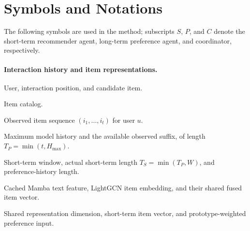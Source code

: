 \documentclass[11pt]{article}
\begin{document}

\appendix
\section{Symbols and Notations}
\label{app:notations}
The following symbols are used in the method; subscripts $S$, $P$, and $C$ denote the short-term recommender agent, long-term preference agent, and coordinator, respectively.

\paragraph{Interaction history and item representations.}
\begin{description}[leftmargin=2.4cm,labelwidth=2.1cm,itemsep=0pt]
\item[$u,t,i$] User, interaction position, and candidate item.
\item[$\mathcal I$] Item catalog.
\item[$\mathcal H_{u,t}$] Observed item sequence $(i_1,\ldots,i_t)$ for user $u$.
\item[$H_{\max},\overline{\mathcal H}_{u,t}$] Maximum model history and the available observed suffix, of length $T_P=\min(t,H_{\max})$.
\item[$W,T_S,T_P$] Short-term window, actual short-term length $T_S=\min(T_P,W)$, and preference-history length.
\item[$f_i,g_i,e_i$] Cached Mamba text feature, LightGCN item embedding, and their shared fused item vector.
\item[$d,y_k^{(S)},y_k^{(P)}$] Shared representation dimension, short-term item vector, and prototype-weighted preference input.
\end{description}
\end{document}
